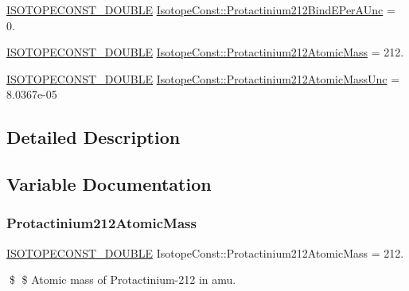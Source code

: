 \begin{DoxyCompactItemize}
\item 
\mbox{\hyperlink{group___isotope_const-_macros_ga8f45a7272ce02c0b4c65c44636ed719a}{I\+S\+O\+T\+O\+P\+E\+C\+O\+N\+S\+T\+\_\+\+D\+O\+U\+B\+LE}} \mbox{\hyperlink{group___isotope_const-_protactinium-_pa212_ga7fd2efc46f520a320ce1b40266a03cff}{Isotope\+Const\+::\+Protactinium212\+Bind\+E\+Per\+A\+Unc}} = 0.
\item 
\mbox{\hyperlink{group___isotope_const-_macros_ga8f45a7272ce02c0b4c65c44636ed719a}{I\+S\+O\+T\+O\+P\+E\+C\+O\+N\+S\+T\+\_\+\+D\+O\+U\+B\+LE}} \mbox{\hyperlink{group___isotope_const-_protactinium-_pa212_gaf7ff76f6bac59fe5d5aacecd667c1e7b}{Isotope\+Const\+::\+Protactinium212\+Atomic\+Mass}} = 212.
\item 
\mbox{\hyperlink{group___isotope_const-_macros_ga8f45a7272ce02c0b4c65c44636ed719a}{I\+S\+O\+T\+O\+P\+E\+C\+O\+N\+S\+T\+\_\+\+D\+O\+U\+B\+LE}} \mbox{\hyperlink{group___isotope_const-_protactinium-_pa212_gae22725cf08ccf899d863e3edff918e67}{Isotope\+Const\+::\+Protactinium212\+Atomic\+Mass\+Unc}} = 8.\+0367e-\/05
\end{DoxyCompactItemize}


\subsection{Detailed Description}


\subsection{Variable Documentation}
\mbox{\label{group___isotope_const-_protactinium-_pa212_gaf7ff76f6bac59fe5d5aacecd667c1e7b}} 
\subsubsection{\texorpdfstring{Protactinium212\+Atomic\+Mass}{Protactinium212AtomicMass}}
{\footnotesize\ttfamily \mbox{\hyperlink{group___isotope_const-_macros_ga8f45a7272ce02c0b4c65c44636ed719a}{I\+S\+O\+T\+O\+P\+E\+C\+O\+N\+S\+T\+\_\+\+D\+O\+U\+B\+LE}} Isotope\+Const\+::\+Protactinium212\+Atomic\+Mass = 212.}

\$ \$ Atomic mass of Protactinium-\/212 in amu. \mbox{\label{group___isotope_const-_protactinium-_pa212_gae22725cf08ccf899d863e3edff918e67}} 
